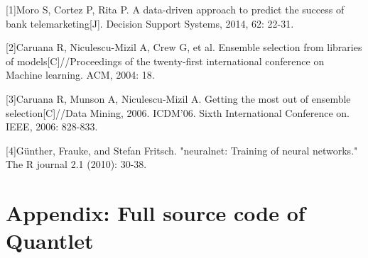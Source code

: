 \documentclass[12pt, a4paper, bibliography=totoc, english]{scrartcl}
\begin{document}
\clearpage

\begin{center}
\end{center}

[1]Moro S, Cortez P, Rita P. A data-driven approach to predict the success of bank telemarketing[J]. Decision Support Systems, 2014, 62: 22-31.

[2]Caruana R, Niculescu-Mizil A, Crew G, et al. Ensemble selection from libraries of models[C]//Proceedings of the twenty-first international conference on Machine learning. ACM, 2004: 18.

[3]Caruana R, Munson A, Niculescu-Mizil A. Getting the most out of ensemble selection[C]//Data Mining, 2006. ICDM'06. Sixth International Conference on. IEEE, 2006: 828-833.

[4]Günther, Frauke, and Stefan Fritsch. "neuralnet: Training of neural networks." The R journal 2.1 (2010): 30-38.

\clearpage

\appendix
\section{Appendix: Full source code of Quantlet}
\end{document}
